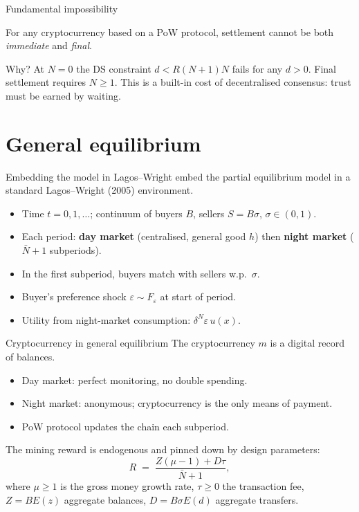 \documentclass[aspectratio=169,xcolor=dvipsnames]{beamer}
\begin{document}
\begin{frame}{Fundamental impossibility}
    \begin{theorem}
        For any cryptocurrency based on a PoW protocol, settlement cannot be both
        \emph{immediate} and \emph{final}.
    \end{theorem}
    \vspace{3mm}
    Why? At $N=0$ the DS constraint $d<R(N+1)N$ fails for any $d>0$.
    Final settlement requires $N\ge 1$.
    \vspace{3mm}
    This is a built-in cost of decentralised consensus: trust must be earned by waiting.
\end{frame}

\section{General equilibrium}

\begin{frame}{Embedding the model in Lagos--Wright}
    \citet{chiu2017} embed the partial equilibrium model in a standard
    Lagos--Wright (2005) environment.
    \vspace{2mm}
    \begin{itemize}
        \item Time $t=0,1,\ldots$; continuum of buyers $B$, sellers $S=B\sigma$, $\sigma\in(0,1)$.
        \item Each period: \textbf{day market} (centralised, general good $h$) then
              \textbf{night market} ($\bar N+1$ subperiods).
        \item In the first subperiod, buyers match with sellers w.p.\ $\sigma$.
        \item Buyer's preference shock $\varepsilon\sim F_\varepsilon$ at start of period.
        \item Utility from night-market consumption: $\delta^N \varepsilon\, u(x)$.
    \end{itemize}
\end{frame}

\begin{frame}{Cryptocurrency in general equilibrium}
    The cryptocurrency $m$ is a digital record of balances.
    \vspace{2mm}
    \begin{itemize}
        \item Day market: perfect monitoring, no double spending.
        \item Night market: anonymous; cryptocurrency is the only means of payment.
        \item PoW protocol updates the chain each subperiod.
    \end{itemize}
    \vspace{2mm}
    The mining reward is endogenous and pinned down by design parameters:
    \[
        R \;=\; \frac{Z(\mu - 1) + D\tau}{\bar N+1}, \tag{23}
    \]
    where $\mu\ge 1$ is the gross money growth rate, $\tau\ge 0$ the transaction fee,
    $Z=BE(z)$ aggregate balances, $D=B\sigma E(d)$ aggregate transfers.
\end{frame}
\end{document}
